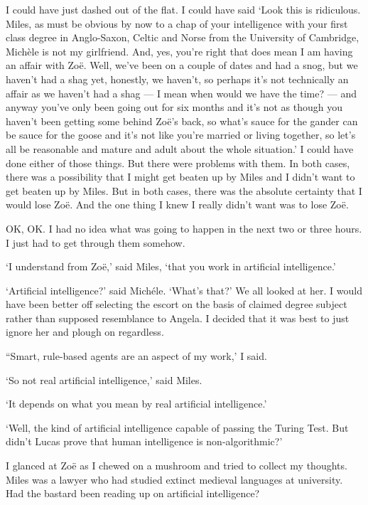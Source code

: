 I could have just dashed out of the flat. I could have said `Look
this is ridiculous. Miles, as must be obvious by now to a chap of
your intelligence with your first class degree in Anglo-Saxon, Celtic and Norse from the University of Cambridge, Michèle is not my girlfriend. And, yes,
you're right that does mean I am having an affair with Zoë.
Well, we've been on a couple of dates and had a snog, but we haven't
had a shag yet, honestly, we haven't, so perhaps it's not
technically an affair as we haven't had a shag --- I mean when would we have the time? --- and anyway you've
only been going out for six months and it's not as though you
haven't been getting some behind Zoë's back, so what's sauce for
the gander can be sauce for the goose and it's not like you're
married or living together, so let's all be reasonable and mature
and adult about the whole situation.' I could have done either of
those things. But there were problems with them. In both cases,
there was a possibility that I might get beaten up by Miles and I
didn't want to get beaten up by Miles. But in both cases, there was
the absolute certainty that I would lose Zoë. And the one thing
I knew I really didn't want was to lose Zoë.

OK, OK. I had no idea what was going to happen in the next two or
three hours. I just had to get through them somehow.

`I understand from Zoë,' said Miles, `that you work in
artificial intelligence.'

`Artificial intelligence?' said Michéle. `What's that?' We all
looked at her. I would have been better off selecting the escort on
the basis of claimed degree subject rather than supposed resemblance
to Angela. I decided that it was best to just ignore her and plough
on regardless.

``Smart, rule-based agents are an aspect of my work,' I said.

`So not {\twelveit real\/} artificial intelligence,' said Miles.

`It depends on what you mean by real artificial intelligence.'

`Well, the kind of artificial intelligence capable of passing the
Turing Test. But didn't Lucas prove that human intelligence is
non-algorithmic?'

I glanced at Zoë as I chewed on a mushroom and tried to collect
my thoughts. Miles was a lawyer who had studied extinct medieval
languages at university. Had the bastard been reading up on
artificial intelligence?


